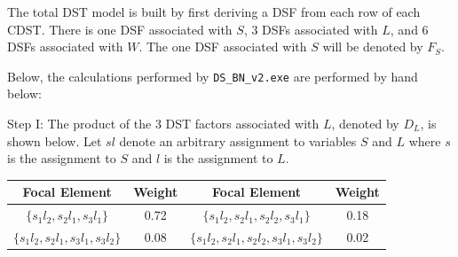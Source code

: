 \documentclass{article}
\begin{document}
The total DST model is built by first deriving a DSF from each row of each CDST. There is one DSF associated with \(S\), 3 DSFs associated with \(L\), and 6 DSFs associated with \(W\). 
The one DSF associated with \(S\) will be denoted by \(F_S\).

Below, the calculations performed by \texttt{DS\_BN\_v2.exe} are performed by hand below:

{Step I:}
The product of the 3 DST factors associated with \(L\),  denoted by \(D_L\), is shown below. Let \(sl\)  denote an arbitrary assignment to variables \(S\) and \(L\) where \(s\) is the assignment to \(S\) and \(l\) is the assignment to \(L\).

\begin{center}
\begin{small}
\begin{tabular}{|c|c||c|c|}
\hline
Focal Element & Weight& Focal Element & Weight\\
\hline
\(\{s_1l_2, s_2l_1, s_3l_1\}\) & 0.72& \(\{s_1l_2, s_2l_1, s_2l_2, s_3l_1\}\) & 0.18\\
\(\{s_1l_2, s_2l_1, s_3l_1, s_3l_2\}\) & 0.08 &\(\{s_1l_2, s_2l_1, s_2l_2, s_3l_1, s_3l_2\}\) & 0.02\\
\hline
\end{tabular}
\end{small}
\end{center}
\end{document}
